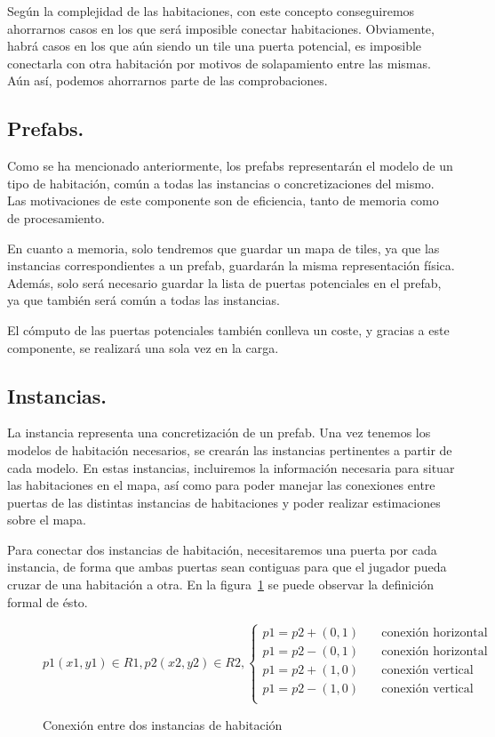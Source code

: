 Según la complejidad de las habitaciones, con este concepto conseguiremos ahorrarnos casos en los que será imposible conectar habitaciones. Obviamente, habrá casos en los que aún siendo un tile una puerta potencial, es imposible conectarla con otra habitación por motivos de solapamiento entre las mismas. Aún así, podemos ahorrarnos parte de las comprobaciones.

\subsection{Prefabs.}

Como se ha mencionado anteriormente, los prefabs representarán el modelo de un tipo de habitación, común a todas las instancias o concretizaciones del mismo. Las motivaciones de este componente son de eficiencia, tanto de memoria como de procesamiento.

En cuanto a memoria, solo tendremos que guardar un mapa de tiles, ya que las instancias correspondientes a un prefab, guardarán la misma representación física. Además, solo será necesario guardar la lista de puertas potenciales en el prefab, ya que también será común a todas las instancias.

El cómputo de las puertas potenciales también conlleva un coste, y gracias a este componente, se realizará una sola vez en la carga.

\subsection{Instancias.}

La instancia representa una concretización de un prefab. Una vez tenemos los modelos de habitación necesarios, se crearán las instancias pertinentes a partir de cada modelo. En estas instancias, incluiremos la información necesaria para situar las habitaciones en el mapa, así como para poder manejar las conexiones entre puertas de las distintas instancias de habitaciones y poder realizar estimaciones sobre el mapa.

Para conectar dos instancias de habitación, necesitaremos una puerta por cada instancia, de forma que ambas puertas sean contiguas para que el jugador pueda cruzar de una habitación a otra. En la figura~\ref{fig:instp} se puede observar la definición formal de ésto.

\begin{figure}[h]
\centering
{
$$
p1(x1,y1) \in R1, p2(x2,y2) \in R2, \begin{cases}
	p1 = p2 + (0,1) & \quad \text{conexión horizontal} \\
	p1 = p2 - (0,1) & \quad \text{conexión horizontal} \\
	p1 = p2 + (1,0) & \quad \text{conexión vertical}   \\
	p1 = p2 - (1,0) & \quad \text{conexión vertical}   \\
\end{cases}
$$
}
\caption{Conexión entre dos instancias de habitación
\label{fig:instp}
}
\end{figure}

